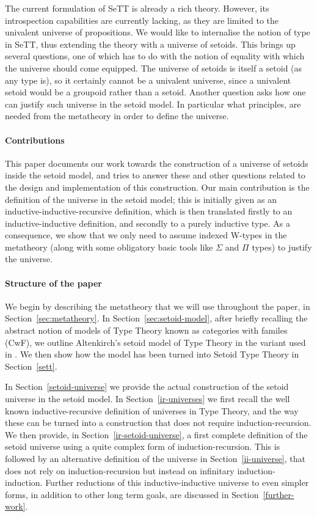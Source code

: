\documentclass{easychair}
\begin{document}
The current formulation of SeTT is already a rich theory. However, its
introspection capabilities are currently lacking, as they are limited to the
univalent universe of propositions. We would like to internalise the notion of
type in SeTT, thus extending the theory with a universe of setoids.
%
This brings up several questions, one of which has to do with the notion of
equality with which the universe should come equipped. The universe of setoids
is itself a setoid (as any type is), so it certainly cannot be a univalent
universe, since a univalent setoid would be a groupoid rather than a setoid.
%
Another question asks how one can justify such universe in the setoid model. In
particular what principles, are needed from the metatheory in order to define
the universe.

\paragraph{Contributions}

This paper documents our work towards the construction of a universe of setoids
inside the setoid model, and tries to answer these and other questions related
to the design and implementation of this construction. Our main contribution is
the definition of the universe in the setoid model; this is initially given as
an inductive-inductive-recursive definition, which is then translated firstly to
an inductive-inductive definition, and secondly to a purely inductive type. As a
consequence, we show that we only need to assume indexed W-types in the
metatheory (along with some obligatory basic tools like $\Sigma$ and $\Pi$
types) to justify the universe.

\paragraph{Structure of the paper}

We begin by describing the metatheory that we will use throughout the paper, in
Section~\ref{sec:metatheory}. In Section~\ref{sec:setoid-model}, after briefly
recalling the abstract notion of models of Type Theory known as categories with
familes (CwF), we outline Altenkirch's setoid model of Type Theory in the
variant used in \cite{mpc19}. We then show how the model has been turned into
Setoid Type Theory in Section~\ref{sett}.

In Section~\ref{setoid-universe} we provide the actual construction of the
setoid universe in the setoid model. In Section~\ref{ir-universes} we first
recall the well known inductive-recursive definition of universes in Type
Theory, and the way these can be turned into a construction that does not
require induction-recursion.
%
We then provide, in Section~\ref{ir-setoid-universe}, a first complete
definition of the setoid universe using a quite complex form of
induction-recursion. This is followed by an alternative definition of the
universe in Section~\ref{ii-universe}, that does not rely on induction-recursion
but instead on infinitary induction-induction.
%
Further reductions of this inductive-inductive universe to even simpler forms,
in addition to other long term goals, are discussed in
Section~\ref{further-work}.
\end{document}
